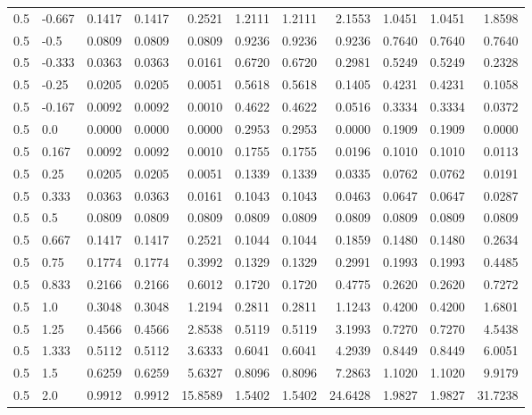 \begin{landscape}
\begin{table}[h!]
\begin{tabular}{ll rrr rrr rrr}
   0.5 & -0.667 & 0.1417 & 0.1417 & 0.2521   & 1.2111 & 1.2111 & 2.1553    & 1.0451 & 1.0451 & 1.8598 \\
   0.5 & -0.5   & 0.0809 & 0.0809 & 0.0809   & 0.9236 & 0.9236 & 0.9236    & 0.7640 & 0.7640 & 0.7640 \\
   0.5 & -0.333 & 0.0363 & 0.0363 & 0.0161   & 0.6720 & 0.6720 & 0.2981    & 0.5249 & 0.5249 & 0.2328 \\
   0.5 & -0.25  & 0.0205 & 0.0205 & 0.0051   & 0.5618 & 0.5618 & 0.1405    & 0.4231 & 0.4231 & 0.1058 \\
   0.5 & -0.167 & 0.0092 & 0.0092 & 0.0010   & 0.4622 & 0.4622 & 0.0516    & 0.3334 & 0.3334 & 0.0372 \\
   0.5 & 0.0    & 0.0000 & 0.0000 & 0.0000   & 0.2953 & 0.2953 & 0.0000    & 0.1909 & 0.1909 & 0.0000 \\
   0.5 & 0.167  & 0.0092 & 0.0092 & 0.0010   & 0.1755 & 0.1755 & 0.0196    & 0.1010 & 0.1010 & 0.0113 \\
   0.5 & 0.25   & 0.0205 & 0.0205 & 0.0051   & 0.1339 & 0.1339 & 0.0335    & 0.0762 & 0.0762 & 0.0191 \\
   0.5 & 0.333  & 0.0363 & 0.0363 & 0.0161   & 0.1043 & 0.1043 & 0.0463    & 0.0647 & 0.0647 & 0.0287 \\
   0.5 & 0.5    & 0.0809 & 0.0809 & 0.0809   & 0.0809 & 0.0809 & 0.0809    & 0.0809 & 0.0809 & 0.0809 \\
   0.5 & 0.667  & 0.1417 & 0.1417 & 0.2521   & 0.1044 & 0.1044 & 0.1859    & 0.1480 & 0.1480 & 0.2634 \\
   0.5 & 0.75   & 0.1774 & 0.1774 & 0.3992   & 0.1329 & 0.1329 & 0.2991    & 0.1993 & 0.1993 & 0.4485 \\
   0.5 & 0.833  & 0.2166 & 0.2166 & 0.6012   & 0.1720 & 0.1720 & 0.4775    & 0.2620 & 0.2620 & 0.7272 \\
   0.5 & 1.0    & 0.3048 & 0.3048 & 1.2194   & 0.2811 & 0.2811 & 1.1243    & 0.4200 & 0.4200 & 1.6801 \\
   0.5 & 1.25   & 0.4566 & 0.4566 & 2.8538   & 0.5119 & 0.5119 & 3.1993    & 0.7270 & 0.7270 & 4.5438 \\
   0.5 & 1.333  & 0.5112 & 0.5112 & 3.6333   & 0.6041 & 0.6041 & 4.2939    & 0.8449 & 0.8449 & 6.0051 \\
   0.5 & 1.5    & 0.6259 & 0.6259 & 5.6327   & 0.8096 & 0.8096 & 7.2863    & 1.1020 & 1.1020 & 9.9179 \\
   0.5 & 2.0    & 0.9912 & 0.9912 & 15.8589  & 1.5402 & 1.5402 & 24.6428   & 1.9827 & 1.9827 & 31.7238 \\

\end{tabular}
\end{table}
\end{landscape}
